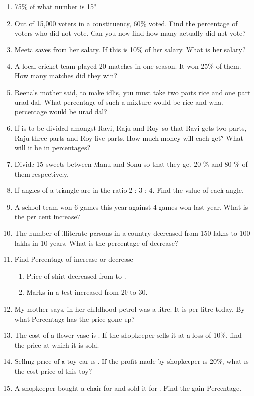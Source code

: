 \begin{enumerate}[label=\thesection.\arabic*,ref=\thesection.\theenumi,resume*]
\item 	75\% of what number is 15?
\item Out of 15,000 voters in a constituency, 60\% voted. Find the percentage of voters who did not vote. Can you now find how many actually did not vote?
\item  Meeta saves  from her salary. If this is 10\% of her salary. What is her salary?
\item  A local cricket team played 20
	matches in one season. It won 25\% of them. How many matches did they win?
\item Reena’s mother said, to make idlis, you must take two parts rice and one part urad dal. What percentage of such a mixture would be rice and what percentage would be urad dal?
\item If  is to be divided amongst Ravi, Raju and Roy, so that Ravi gets two parts, Raju three parts and Roy five parts. How much money will each get? What will it be in percentages?
\item 	Divide 15 sweets between Manu and Sonu so that they get 20 \% and 80 \% of them respectively.
\item If angles of a triangle are in the ratio 2 : 3 : 4. Find the value of each angle.
\item A school team won 6 games this year against 4 games won last year. What is the per cent increase?
\item The number of illiterate persons in a country decreased from 150 lakhs to 100 lakhs in 10 years. What is the percentage of decrease?
\item Find Percentage of increase or decrease
	\begin{enumerate}
	\item  Price of shirt decreased from  to .
	\item Marks in a test increased from 20 to 30.
	\end{enumerate}
\item  My mother says, in her childhood petrol was  a litre. It is  per litre today. By what Percentage has the price gone up?
\item The cost of a flower vase is . If the shopkeeper sells it at a loss of 10\%, find the price at which it is sold.
\item Selling price of a toy car is . If the profit made by shopkeeper is 20\%, what is the cost price of this toy?
\item A shopkeeper bought a chair for  and sold it for . Find the gain Percentage. 

\end{enumerate}
